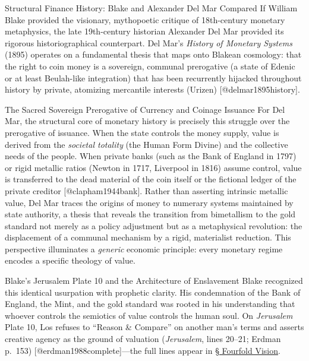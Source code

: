 \documentclass[
  ignorenonframetext,
]{beamer}
\author{\texorpdfstring{}{}}
\date{}
\begin{document}
\begin{frame}{Structural Finance History: Blake and Alexander Del Mar
Compared}
\protect{}\label{structural-finance-history-blake-and-alexander-del-mar-compared}
If William Blake provided the visionary, mythopoetic critique of
18th-century monetary metaphysics, the late 19th-century historian
Alexander Del Mar provided its rigorous historiographical counterpart.
Del Mar's \emph{History of Monetary Systems} (1895) operates on a
fundamental thesis that maps onto Blakean cosmology: that the right to
coin money is a sovereign, communal prerogative (a state of Edenic or at
least Beulah-like integration) that has been recurrently hijacked
throughout history by private, atomizing mercantile interests (Urizen)
{[}@delmar1895history{]}.

\begin{block}{The Sacred Sovereign Prerogative of Currency and Coinage
Issuance}
\protect{}\label{the-sacred-sovereign-prerogative-of-currency-and-coinage-issuance}
For Del Mar, the structural core of monetary history is precisely this
struggle over the prerogative of issuance. When the state controls the
money supply, value is derived from the \emph{societal totality} (the
Human Form Divine) and the collective needs of the people. When private
banks (such as the Bank of England in 1797) or rigid metallic ratios
(Newton in 1717, Liverpool in 1816) assume control, value is transferred
to the dead material of the coin itself or the fictional ledger of the
private creditor {[}@clapham1944bank{]}. Rather than asserting intrinsic
metallic value, Del Mar traces the origins of money to numerary systems
maintained by state authority, a thesis that reveals the transition from
bimetallism to the gold standard not merely as a policy adjustment but
as a metaphysical revolution: the displacement of a communal mechanism
by a rigid, materialist reduction. This perspective illuminates a
\emph{generic} economic principle: every monetary regime encodes a
specific theology of value.
\end{block}

\begin{block}{Blake's Jerusalem Plate 10 and the Architecture of
Enslavement}
\protect{}\label{blakes-jerusalem-plate-10-and-the-architecture-of-enslavement}
Blake recognized this identical usurpation with prophetic clarity. His
condemnation of the Bank of England, the Mint, and the gold standard was
rooted in his understanding that whoever controls the semiotics of value
controls the human soul. On \emph{Jerusalem} Plate 10, Los refuses to
``Reason \& Compare'' on another man's terms and asserts creative agency
as the ground of valuation (\emph{Jerusalem}, lines 20--21; Erdman
p.~153) {[}@erdman1988complete{]}---the full lines appear in
\hyperlink{sec-four-levels-vision}{§ Fourfold Vision}.


\end{block}
\end{frame}
\end{document}
